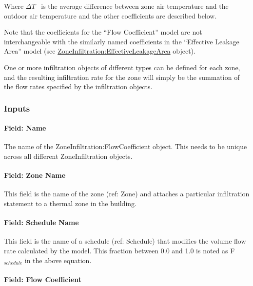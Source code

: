 Where \(\Delta T\) ~is the average difference between zone air temperature and the outdoor air temperature and the other coefficients are described below.

Note that the coefficients for the ``Flow Coefficient'' model are not interchangeable with the similarly named coefficients in the ``Effective Leakage Area'' model (see \hyperref[zoneinfiltrationeffectiveleakagearea]{ZoneInfiltration:EffectiveLeakageArea} object).

One or more infiltration objects of different types can be defined for each zone, and the resulting infiltration rate for the zone will simply be the summation of the flow rates specified by the infiltration objects.

\subsubsection{Inputs}\label{inputs-2-005}

\paragraph{Field: Name}\label{field-name-2-004}

The name of the ZoneInfiltration:FlowCoefficient object. This needs to be unique across all different ZoneInfiltration objects.

\paragraph{Field: Zone Name}\label{field-zone-name-1-001}

This field is the name of the zone (ref: Zone) and attaches a particular infiltration statement to a thermal zone in the building.

\paragraph{Field: Schedule Name}\label{field-schedule-name-2}

This field is the name of a schedule (ref: Schedule) that modifies the volume flow rate calculated by the model. This fraction between 0.0 and 1.0 is noted as F\(_{schedule}\) in the above equation.

\paragraph{Field: Flow Coefficient}\label{field-flow-coefficient}

